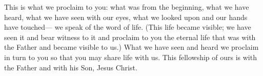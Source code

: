 \lettrine[lines=3]{T}{}his is what we proclaim to you:
what was from the beginning,
what we have heard,
what we have seen with our eyes,
what we looked upon
and our hands have touched—
we speak of the word of life.
(This life became visible;
we have seen it and bear witness to it
and proclaim to you the eternal life
that was with the Father
and became visible to us.)
What we have seen and heard
we proclaim in turn to you
so that you may share life with us.
This fellowship of ours is with the Father
and with his Son, Jesus Christ.